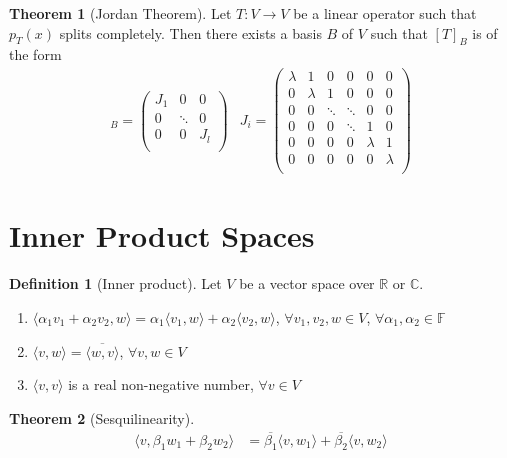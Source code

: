 \documentclass[fleqn, a5paper, 10pt]{amsart}
\theoremstyle{definition}
\newtheorem{definition}{Definition} %
\theoremstyle{theorem}
\newtheorem{theorem}{Theorem} %
\theoremstyle{remark}
\numberwithin{corollary}{theorem}
\numberwithin{equation}{theorem}
\begin{document}
\begin{theorem}[Jordan Theorem]
	Let $T : V \to V$ be a linear operator such that $p_T (x)$ splits completely. Then there exists a basis $B$ of $V$ such that $[T]_B$ is of the form
	\begin{align*}
		[T]_B = 
		\begin{pmatrix}
			J_1 & 0 & 0\\
			0 & \ddots & 0\\
			0 & 0 & J_l\\
		\end{pmatrix}
		&
		J_i = 
			\begin{pmatrix}
				\lambda & 1 & 0 & 0 & 0 & 0\\
				0 & \lambda & 1 & 0 & 0 & 0\\
				0 & 0 & \ddots & \ddots & 0 & 0\\
				0 & 0 & 0 & \ddots & 1 & 0\\
				0 & 0 & 0 & 0 &\lambda & 1\\
				0 & 0 & 0 & 0 & 0 & \lambda\\
			\end{pmatrix}
		\end{align*}
\end{theorem}

\section{Inner Product Spaces}

\begin{definition}[Inner product]
	Let $V$ be a vector space over $\mathbb{R}$ or $\mathbb{C}$.
	\begin{enumerate}
		\item $\langle \alpha_1 v_1 + \alpha_2 v_2, w \rangle = \alpha_1 \langle v_1, w \rangle + \alpha_2 \langle v_2, w \rangle$, $\forall v_1, v_2, w \in V$, $\forall \alpha_1, \alpha_2 \in \mathbb{F}$
		\item $\langle v, w \rangle = \overline{\langle w, v \rangle}$, $\forall v, w \in V$
		\item $\langle v, v \rangle$ is a real non-negative number, $\forall v \in V$
	\end{enumerate}
\end{definition}

\begin{theorem}[Sesquilinearity]
	\begin{align*}
		\langle v, \beta_1 w_1 + \beta_2 w_2 \rangle &= \overline{\beta_1} \langle v, w_1 \rangle + \overline{\beta_2} \langle v, w_2 \rangle
	\end{align*}
\end{theorem}
\end{document}
